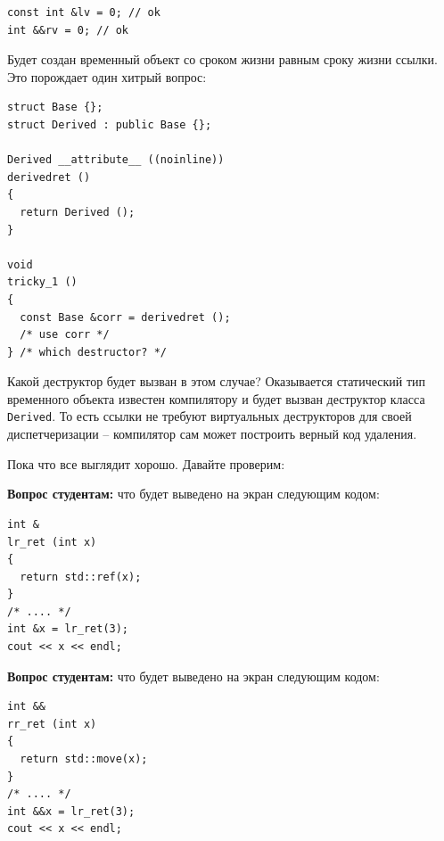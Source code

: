 \documentclass[a4paper,12pt,oneside]{article}
\newif\ifanswers
\begin{document}
\begin{lstlisting}
const int &lv = 0; // ok
int &&rv = 0; // ok
\end{lstlisting}

Будет создан временный объект со сроком жизни равным сроку жизни ссылки. Это порождает один хитрый вопрос:

\begin{lstlisting}
struct Base {};
struct Derived : public Base {};

Derived __attribute__ ((noinline))
derivedret ()
{
  return Derived ();
}

void
tricky_1 ()
{
  const Base &corr = derivedret ();
  /* use corr */
} /* which destructor? */
\end{lstlisting}

Какой деструктор будет вызван в этом случае? Оказывается статический тип временного объекта известен компилятору и будет вызван деструктор класса \lstinline!Derived!. То есть ссылки не требуют виртуальных деструкторов для своей диспетчеризации -- компилятор сам может построить верный код удаления.

Пока что все выглядит хорошо. Давайте проверим:

\textbf{Вопрос студентам:} что будет выведено на экран следующим кодом:

\begin{lstlisting}
int &
lr_ret (int x)
{
  return std::ref(x);
}
/* .... */
int &x = lr_ret(3);
cout << x << endl;
\end{lstlisting}

\ifanswers
Правильный ответ: что угодно, это dangling reference.
\fi

\textbf{Вопрос студентам:} что будет выведено на экран следующим кодом:

\begin{lstlisting}
int &&
rr_ret (int x)
{
  return std::move(x);
}
/* .... */
int &&x = lr_ret(3);
cout << x << endl;
\end{lstlisting}

\ifanswers
Правильный ответ: и снова что угодно. Мы получили удивительную вещь: \textbf{dangling rvalue reference}. Так же как висячих левых, надо опасаться висячих правых ссылок. Опять-таки есть способы их получить:

\begin{lstlisting}
extern int xret (int x);
int &&p = xret (3); /* ok */
int &&p = std::move (xret (3)); /* dangling rvalue reference */
\end{lstlisting}
\fi
\end{document}
